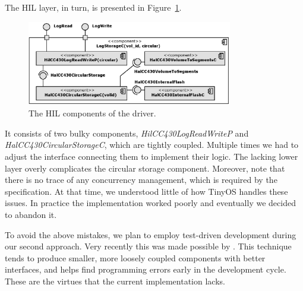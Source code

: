 The HIL layer, in turn, is presented in Figure~\ref{fig:log_storage_c}.
\begin{figure}[h]
  \centering
  \includegraphics[width=0.8\textwidth]{diagrams/log_storage_c.eps}
  \caption{The HIL components of the driver.}
  \label{fig:log_storage_c}
\end{figure}
It consists of two bulky components, \emph{HilCC430LogReadWriteP} and \emph{HalCC430CircularStorageC}, which are tightly coupled.
Multiple times we had to adjust the interface connecting them to implement their logic. The lacking lower layer overly complicates the circular storage component. Moreover, note that there is no trace of any concurrency management, which is required by the specification. At that time, we understood little of how TinyOS handles these issues. In practice the implementation worked poorly and eventually we decided to abandon it.

To avoid the above mistakes, we plan to employ test-driven development during our second approach. Very recently this was made possible by \cite{TOSMock}. This technique tends to produce smaller, more loosely coupled components with better interfaces, and helps find programming errors early in the development cycle. These are the virtues that the current implementation lacks.







